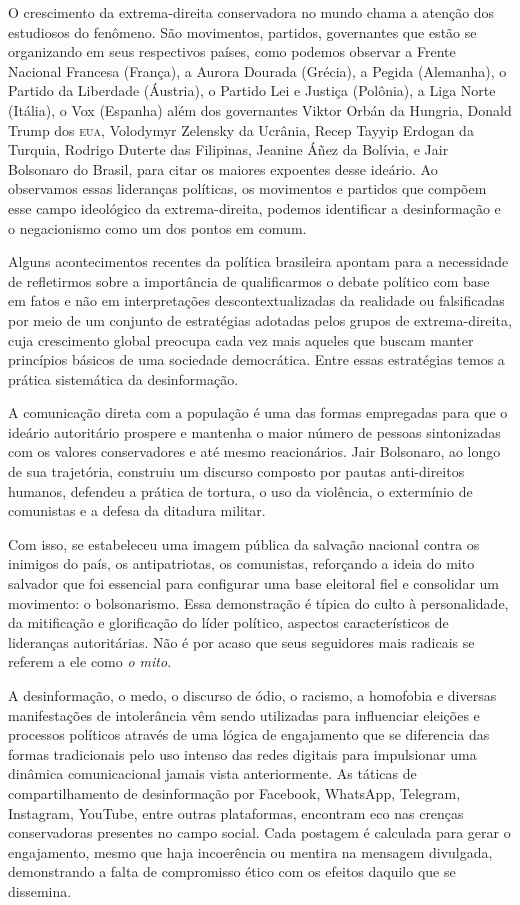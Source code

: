 O crescimento da extrema-direita conservadora no mundo chama a atenção
dos estudiosos do fenômeno. São movimentos, partidos, governantes que
estão se organizando em seus respectivos países, como podemos observar a
Frente Nacional Francesa (França), a Aurora Dourada (Grécia), a Pegida
(Alemanha), o Partido da Liberdade (Áustria), o Partido Lei e Justiça
(Polônia), a Liga Norte (Itália), o Vox (Espanha) além dos governantes
Viktor Orbán da Hungria, Donald Trump dos \textsc{eua},
Volodymyr Zelensky da Ucrânia, Recep Tayyip Erdogan da Turquia, Rodrigo Duterte
das Filipinas, Jeanine Áñez da Bolívia, e Jair
Bolsonaro do Brasil, para citar os maiores expoentes desse ideário. Ao
observamos essas lideranças políticas, os movimentos e partidos que
compõem esse campo ideológico da extrema-direita, podemos identificar a
desinformação e o negacionismo como um dos pontos em comum.

Alguns acontecimentos recentes da política brasileira apontam para a
necessidade de refletirmos sobre a importância de qualificarmos o debate
político com base em fatos e não em interpretações descontextualizadas
da realidade ou falsificadas por meio de um conjunto de estratégias
adotadas pelos grupos de extrema-direita, cuja crescimento global
preocupa cada vez mais aqueles que buscam manter princípios básicos de
uma sociedade democrática. Entre essas estratégias temos a prática
sistemática da desinformação.

A comunicação direta com a população é uma das formas empregadas para
que o ideário autoritário prospere e mantenha o maior número de pessoas
sintonizadas com os valores conservadores e até mesmo reacionários. Jair
Bolsonaro, ao longo de sua trajetória, construiu um discurso composto
por pautas anti-direitos humanos, defendeu a prática de tortura, o uso
da violência, o extermínio de comunistas e a defesa da ditadura militar.

Com isso, se estabeleceu uma imagem pública da salvação nacional contra os
inimigos do país, os antipatriotas, os comunistas, reforçando a ideia do
mito salvador que foi essencial para configurar uma base eleitoral fiel
e consolidar um movimento: o bolsonarismo. Essa demonstração é típica do
culto à personalidade, da mitificação e glorificação do líder
político, aspectos característicos de lideranças autoritárias. Não é por
acaso que seus seguidores mais radicais se referem a ele como \textit{o
mito}.

A desinformação, o medo, o discurso de ódio, o racismo, a homofobia e
diversas manifestações de intolerância vêm sendo utilizadas para
influenciar eleições e processos políticos através de uma lógica de
engajamento que se diferencia das formas tradicionais pelo uso intenso
das redes digitais para impulsionar uma dinâmica comunicacional jamais
vista anteriormente. As táticas de compartilhamento de desinformação por
Facebook, WhatsApp, Telegram, Instagram, YouTube, entre outras
plataformas, encontram eco nas crenças conservadoras presentes no campo
social. Cada postagem é calculada para gerar o engajamento, mesmo que
haja incoerência ou mentira na mensagem divulgada, demonstrando a falta
de compromisso ético com os efeitos daquilo que se dissemina.


